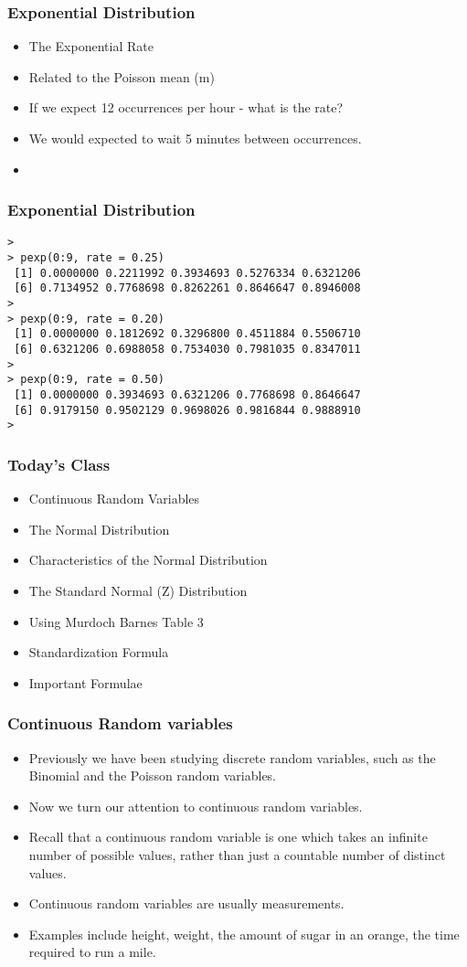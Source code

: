 \documentclass[a4]{beamer}
\begin{document}
\begin{frame}[fragile]
\frametitle{Exponential Distribution}
\begin{itemize}
\item The Exponential Rate 
\item Related to the Poisson mean (m)
\item If we expect 12 occurrences per hour - what is the rate?
\item We would expected to wait 5 minutes between occurrences.
\item 
\end{itemize}
\end{frame}
\begin{frame}[fragile]
\frametitle{Exponential Distribution}
\begin{verbatim}
>
> pexp(0:9, rate = 0.25)
 [1] 0.0000000 0.2211992 0.3934693 0.5276334 0.6321206
 [6] 0.7134952 0.7768698 0.8262261 0.8646647 0.8946008
>
> pexp(0:9, rate = 0.20)
 [1] 0.0000000 0.1812692 0.3296800 0.4511884 0.5506710
 [6] 0.6321206 0.6988058 0.7534030 0.7981035 0.8347011
>
> pexp(0:9, rate = 0.50)
 [1] 0.0000000 0.3934693 0.6321206 0.7768698 0.8646647
 [6] 0.9179150 0.9502129 0.9698026 0.9816844 0.9888910
> 
\end{verbatim}
\end{frame}
\begin{frame}
\frametitle{ Today's Class }
\begin{itemize}
\item Continuous Random Variables
\item The Normal Distribution
\item Characteristics of the Normal Distribution
\item The Standard Normal (Z) Distribution
\item Using Murdoch Barnes Table 3
\item Standardization Formula
\item Important Formulae
\end{itemize}
\end{frame}
\begin{frame}
\frametitle{Continuous Random variables}
\begin{itemize}
\item Previously we have been studying discrete random variables, such as the Binomial and the Poisson random variables.
\item Now we turn our attention to continuous random variables.
\item Recall that a continuous random variable is one which takes an infinite number of possible values, rather than just a countable number of distinct values.
\item Continuous random variables are usually measurements.
\item Examples include height, weight, the amount of sugar in an orange, the time required to run a mile.
\end{itemize}

\end{frame}
\end{document}
